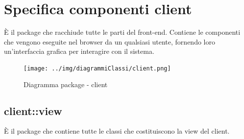 \section{Specifica componenti client}
È il package che racchiude tutte le parti del front-end. Contiene le componenti che vengono eseguite nel browser da un qualsiasi utente, fornendo loro un’interfaccia grafica per interagire con il sistema.\begin{center}
		\begin{figure}[H]
			\centering \texttt{[image: ../img/diagrammiClassi/client.png]}
			\caption{Diagramma package - client}
		\end{figure}
	\end{center}\subsection{client::view}
È il package che contiene tutte le classi che costituiscono la view del client. 
